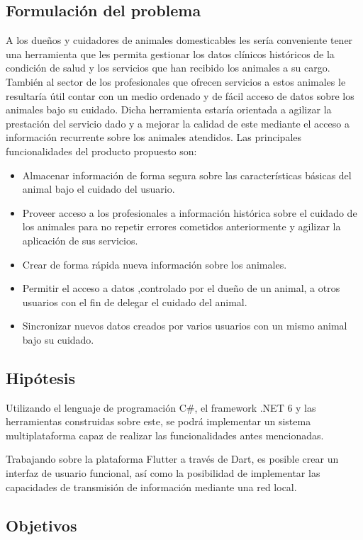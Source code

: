 \subsection*{Formulaci\'on del problema}

A los dueños y cuidadores de animales domesticables les sería conveniente tener una herramienta que les permita gestionar los datos clínicos históricos de la condición de salud y los servicios que han recibido los animales a su cargo. También al sector de los profesionales que ofrecen servicios a estos animales le resultaría útil contar con un medio ordenado y de fácil acceso de datos sobre los animales bajo su cuidado. Dicha herramienta estaría orientada a agilizar la prestación del servicio dado y a mejorar la calidad de este mediante el acceso a información recurrente sobre los animales atendidos. Las principales funcionalidades del producto propuesto son:
\begin{itemize}
\item Almacenar información de forma segura sobre las características básicas del animal bajo el cuidado del usuario.
\item Proveer acceso a los profesionales a información histórica sobre el cuidado de los animales para no repetir errores cometidos anteriormente y agilizar la aplicación de sus servicios.
\item Crear de forma rápida nueva información sobre los animales.
\item Permitir el acceso a datos ,controlado por el dueño de un animal, a otros usuarios con el fin de delegar el cuidado del animal.
\item Sincronizar nuevos datos creados por varios usuarios con un mismo animal bajo su cuidado.
\end{itemize}

\subsection*{Hip\'otesis}
Utilizando el lenguaje de programación C\#, el framework .NET 6 y las herramientas construidas sobre este, se podrá implementar un sistema multiplataforma capaz de realizar las funcionalidades antes mencionadas.

Trabajando sobre la plataforma Flutter a trav\'es de Dart, es posible crear un interfaz de usuario funcional, as\'i como la posibilidad de implementar las capacidades de transmisi\'on de informaci\'on mediante una red local.

\subsection*{Objetivos}


